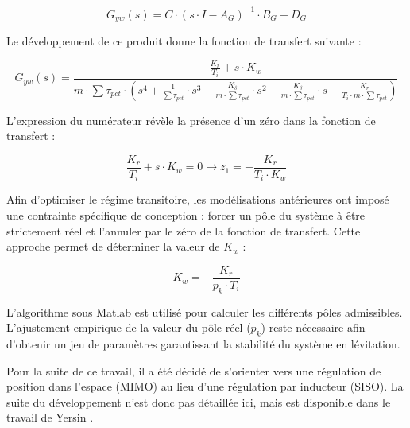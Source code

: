 \begin{equation}
    G_{yw}(s) = C\cdot\left( s\cdot I - A_G \right)^{-1}\cdot B_{G} + D_G
\end{equation}

Le développement de ce produit donne la fonction de transfert suivante :

\begin{equation}
    G_{yw}(s) = \frac{\frac{K_r}{T_i} + s \cdot K_w}{m \cdot \sum\tau_{pct} \cdot \left( s^4 + \frac{1}{\sum\tau_{pct}} \cdot s^3 - \frac{K_{\dot{\delta}}}{m \cdot \sum\tau_{pct}} \cdot s^2 - \frac{K_\delta}{m \cdot \sum\tau_{pct}} \cdot s - \frac{K_r}{T_i \cdot m \cdot \sum\tau_{pct}} \right)}
\end{equation}

L'expression du numérateur révèle la présence d'un zéro dans la fonction de transfert :

\begin{equation}
    \frac{K_r}{T_i} + s \cdot K_w = 0 \rightarrow z_1 = - \frac{K_r}{T_i\cdot K_w}
\end{equation}

Afin d'optimiser le régime transitoire, les modélisations antérieures ont imposé une contrainte spécifique de conception : forcer un pôle du système à être strictement réel et l'annuler par le zéro de la fonction de transfert. Cette approche permet de déterminer la valeur de $K_w$ :

\begin{equation}
    K_w = - \frac{K_r}{p_k\cdot T_i}
\end{equation}

L'algorithme sous Matlab est utilisé pour calculer les différents pôles admissibles. L'ajustement empirique de la valeur du pôle réel ($p_k$) reste nécessaire afin d'obtenir un jeu de paramètres garantissant la stabilité du système en lévitation.

Pour la suite de ce travail, il a été décidé de s'orienter vers une régulation de position dans l'espace (MIMO) au lieu d'une régulation par inducteur (SISO). La suite du développement n'est donc pas détaillée ici, mais est disponible dans le travail de Yersin \cite{Yersin}.


